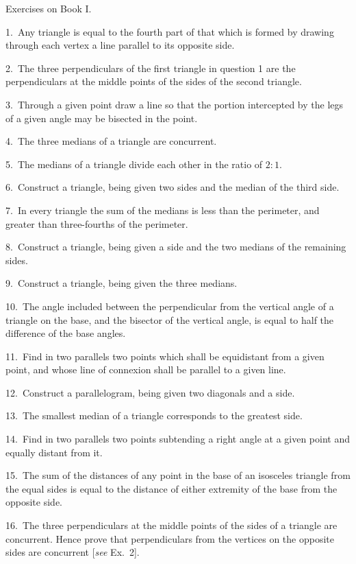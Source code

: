 \documentclass[oneside]{book}
\newcommand\exhead[1]{
\Needspace*{5\baselineskip}\begin{center}
\textsf{#1}
\end{center}
}
\begin{document}
\exhead{Exercises on Book I.}

\begin{footnotesize}
1.~Any triangle is equal to the fourth part of that which is
formed by drawing through each vertex a line parallel to its
opposite side.

2.~The three perpendiculars of the first triangle in question 1
are the perpendiculars at the middle points of the sides of the
second triangle.

3.~Through a given point draw a line so that the portion
intercepted by the legs of a given angle may be bisected in the point.

4.~The three medians of a triangle are concurrent.

5.~The medians of a triangle divide each other in the ratio of
$2:1$.

6.~Construct a triangle, being given two sides and the median
of the third side.

7.~In every triangle the sum of the medians is less than the
perimeter, and greater than three-fourths of the perimeter.

8.~Construct a triangle, being given a side and the two
medians of the remaining sides.

9.~Construct a triangle, being given the three medians.

10.~The angle included between the perpendicular from the
vertical angle of a triangle on the base, and the bisector of the
vertical angle, is equal to half the difference of the base angles.

11.~Find in two parallels two points which shall be equidistant
from a given point, and whose line of connexion shall be parallel
to a given line.

12.~Construct a parallelogram, being given two diagonals and
a side.

13.~The smallest median of a triangle corresponds to the
greatest side.

14.~Find in two parallels two points subtending a right angle
at a given point and equally distant from it.

15.~The sum of the distances of any point in the base of an
isosceles triangle from the equal sides is equal to the distance of
either extremity of the base from the opposite side.

16.~The three perpendiculars at the middle points of the sides
of a triangle are concurrent. Hence prove that perpendiculars
from the vertices on the opposite sides are concurrent [\textit{see}
Ex.~2].


\end{footnotesize}
\end{document}
